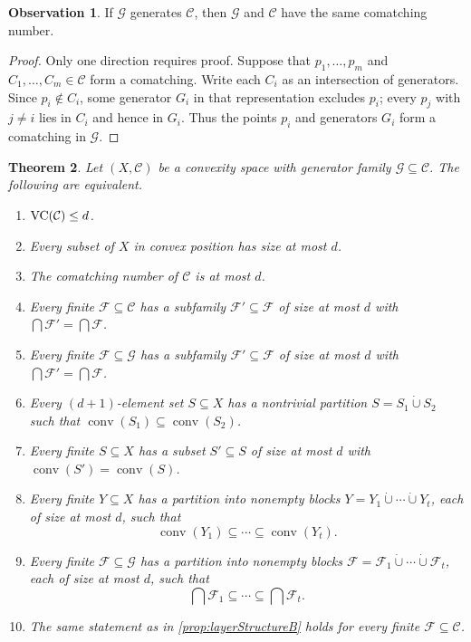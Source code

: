\documentclass[11pt]{article}
\newtheorem{thm}{Theorem}[section]%
\theoremstyle{definition}
\newtheorem{observation}[thm]{Observation}
\newcommand{\F}{\mathcal{F}}
\newcommand{\C}{\mathcal{C}}
\newcommand{\G}{\mathcal{G}}
\newcommand{\conv}{\operatorname{conv}}
\newcommand{\VC}{\textup{VC}}
\begin{document}
\begin{observation}\label{obs:generator-comatching}
If $\G$ generates $\C$, then $\G$ and $\C$ have the same comatching number.
\end{observation}

\begin{proof}
Only one direction requires proof. Suppose that $p_1,\ldots,p_m$ and $C_1,\ldots,C_m\in\C$ form a comatching. Write each $C_i$ as an intersection of generators. Since $p_i\notin C_i$, some generator $G_i$ in that representation excludes $p_i$; every $p_j$ with $j\ne i$ lies in $C_i$ and hence in $G_i$. Thus the points $p_i$ and generators $G_i$ form a comatching in $\G$.
\end{proof}

\begin{thm}\label{thm:strongEquivalences}
Let $(X,\C)$ be a convexity space with generator family $\G\subseteq\C$. The following are equivalent.
\begin{enumerate}
    \item\label{prop:VCofC} $\VC(\C)\le d$.
    \item\label{prop:rank} Every subset of $X$ in convex position has size at most $d$.
    \item\label{prop:comatching} The comatching number of $\C$ is at most $d$.
    \item\label{prop:strongHellyC} Every finite $\F\subseteq\C$ has a subfamily $\F'\subseteq\F$ of size at most $d$ with $\bigcap\F'=\bigcap\F$.
    \item\label{prop:strongHellyB} Every finite $\F\subseteq\G$ has a subfamily $\F'\subseteq\F$ of size at most $d$ with $\bigcap\F'=\bigcap\F$.
    \item\label{prop:strongRadon} Every $(d+1)$-element set $S\subseteq X$ has a nontrivial partition $S=S_1\mathbin{\dot\cup}S_2$ such that $\conv(S_1)\subseteq\conv(S_2)$.
    \item\label{prop:strongCaratheodory} Every finite $S\subseteq X$ has a subset $S'\subseteq S$ of size at most $d$ with $\conv(S')=\conv(S)$.
    \item\label{prop:layerStructureX} Every finite $Y\subseteq X$ has a partition into nonempty blocks $Y=Y_1\mathbin{\dot\cup}\cdots\mathbin{\dot\cup}Y_t$, each of size at most $d$, such that
    \[
    \conv(Y_1)\subseteq\cdots\subseteq\conv(Y_t).
    \]
    \item\label{prop:layerStructureB} Every finite $\F\subseteq\G$ has a partition into nonempty blocks $\F=\F_1\mathbin{\dot\cup}\cdots\mathbin{\dot\cup}\F_t$, each of size at most $d$, such that
    \[
    \bigcap\F_1\subseteq\cdots\subseteq\bigcap\F_t.
    \]
    \item\label{prop:layerStructureC} The same statement as in \ref{prop:layerStructureB} holds for every finite $\F\subseteq\C$.
\end{enumerate}
\end{thm}
\end{document}
